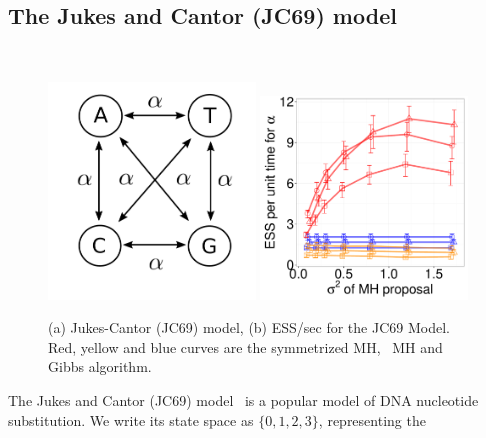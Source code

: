   \subsection{The Jukes and Cantor (JC69) model}~
  \begin{figure}%
  \begin{minipage}[!hp]{0.7\linewidth}
    \includegraphics[width=0.49\textwidth, angle=0]{figs/jc_model.pdf}
    \includegraphics[width=0.49\textwidth, angle=0]{figs/jc.pdf}
  \end{minipage}
  \begin{minipage}[!hp]{0.28\linewidth}
  \caption{(a) Jukes-Cantor (JC69) model, (b)
    ESS/sec for the JC69 Model. Red, yellow and blue curves are the 
      symmetrized MH, \naive\ MH and Gibbs algorithm. }
     \label{fig:ESS_JC}
  \end{minipage}
  \end{figure}
  The Jukes and Cantor (JC69) model~\citep{jukescantor69} is a popular model of DNA nucleotide
  substitution.  We write its state space as $\{0, 1, 2, 3\}$, representing the 
